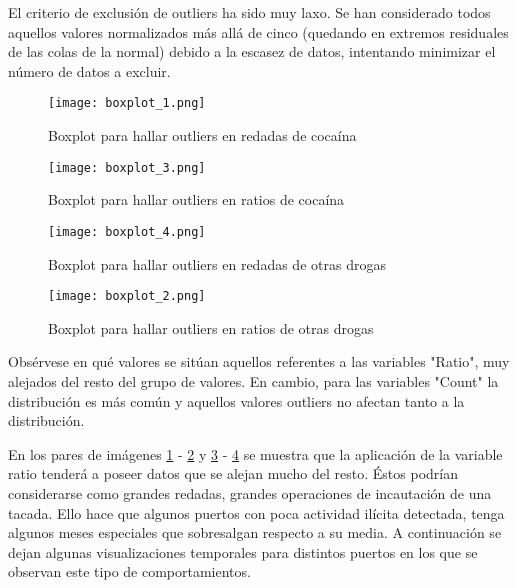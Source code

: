 \documentclass[12pt]{article}
\begin{document}
		
		
		El criterio de exclusión de outliers ha sido muy laxo. Se han considerado todos aquellos valores normalizados más allá de cinco (quedando en extremos residuales de las colas de la normal) debido a la escasez de datos, intentando minimizar el número de datos a excluir.
		
		\begin{figure}[H]
			\caption{\label{boxplot_1} Boxplot para hallar outliers en redadas de cocaína}
			\centering
			\hspace*{1cm}
			\texttt{[image: boxplot\_1.png]}
		\end{figure}
	
		\begin{figure}[H]
			\caption{\label{boxplot_3} Boxplot para hallar outliers en ratios de cocaína}
			\centering
			\hspace*{1cm}
			\texttt{[image: boxplot\_3.png]}
		\end{figure}
	
		\begin{figure}[H]
			\caption{\label{boxplot_4} Boxplot para hallar outliers en redadas de otras drogas}
			\centering
			\hspace*{1cm}
			\texttt{[image: boxplot\_4.png]}
		\end{figure}
	
		\begin{figure}[H]
			\caption{\label{boxplot_2} Boxplot para hallar outliers en ratios de otras drogas}
			\centering
			\hspace*{1cm}
			\texttt{[image: boxplot\_2.png]}
		\end{figure}
	
		Obsérvese en qué valores se sitúan aquellos referentes a las variables "Ratio", muy alejados del resto del grupo de valores. En cambio, para las variables "Count" la distribución es más común y aquellos valores outliers no afectan tanto a la distribución.
	
		En los pares de imágenes \ref{boxplot_1} - \ref{boxplot_3}  y \ref{boxplot_4} - \ref{boxplot_2} se muestra que la aplicación de la variable ratio tenderá a poseer datos que se alejan mucho del resto. Éstos podrían considerarse como grandes redadas, grandes operaciones de incautación de una tacada. Ello hace que algunos puertos con poca actividad ilícita detectada, tenga algunos meses especiales que sobresalgan respecto a su media. A continuación se dejan algunas visualizaciones temporales para distintos puertos en los que se observan este tipo de comportamientos.
	
\end{document}
